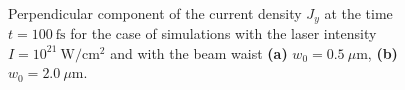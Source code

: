 \begin{figure}[h!]
	\centering
	\\[2mm]
	\caption{Perpendicular component of the current density $ J_{y} $ at the time $ t = 100 \ \mathrm{fs} $ for the case of simulations with the laser intensity $ I = 10^{21} \ \mathrm{W/cm^2} $ and with the beam waist \textbf{(a)} $ w_0 = 0.5 \ \mu\mathrm{m} $, \textbf{(b)} $ w_0 = 2.0 \ \mu\mathrm{m} $.}
	\label{fig:18}
\end{figure}

